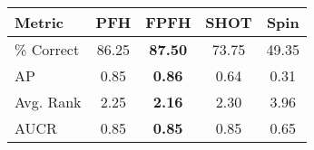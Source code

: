 \begin{tabular}{ | l || c | c | c | c | }
\hline
Metric & PFH & FPFH & SHOT & Spin \\
\hline
 \% Correct & 86.25 & \bf 87.50 & 73.75 & 49.35 \\
AP & 0.85 & \bf 0.86 & 0.64 & 0.31 \\
Avg. Rank & 2.25 & \bf 2.16 & 2.30 & 3.96 \\
AUCR & 0.85 & \bf 0.85 & 0.85 & 0.65 \\
\hline
\end{tabular}
